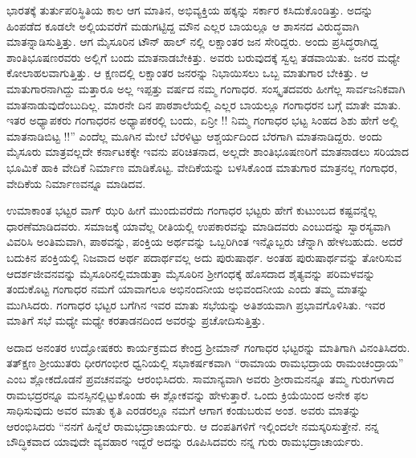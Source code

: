{ಭಾರತಕ್ಕೆ ತುರ್ತುಪರಿಸ್ಥಿತಿಯ ಕಾಲ \enginline{-} ಆಗ ಮಾತಿನ, ಅಭಿವ್ಯಕ್ತಿಯ ಹಕ್ಕನ್ನು ಸರ್ಕಾರ ಕಸಿದುಕೊಂಡಿತ್ತು.  ಅದನ್ನು ಹಿಂಪಡೆದ ಕೂಡಲೇ ಅಲ್ಲಿಯವರೆಗೆ ಮಡುಗಟ್ಟಿದ್ದ ಮೌನ ಎಲ್ಲರ ಬಾಯಲ್ಲೂ ಆ ಶಾಸನದ ವಿರುದ್ಧವಾಗಿ ಮಾತನ್ನಾಡಿಸುತ್ತಿತ್ತು. ಆಗ ಮೈಸೂರಿನ ಟೌನ್ ಹಾಲ್ ನಲ್ಲಿ ಲಕ್ಷಾಂತರ ಜನ ಸೇರಿದ್ದರು. ಅಂದು ಪ್ರಸಿದ್ಧರಾಗಿದ್ದ ಶಾಂತಿ\break ಭೂಷಣರವರು ಅಲ್ಲಿಗೆ ಬಂದು ಮಾತನಾಡಬೇಕಿತ್ತು. ಅವರು ಬರುವುದಕ್ಕೆ ಸ್ವಲ್ಪ ತಡವಾಯಿತು. ಜನರ ಮಧ್ಯೇ ಕೋಲಾಹಲವಾಗುತ್ತಿತ್ತು. ಆ ಕ್ಷಣದಲ್ಲಿ ಲಕ್ಷಾಂತರ ಜನರನ್ನು ನಿಭಾಯಿಸಲು ಒಬ್ಬ ಮಾತುಗಾರ ಬೇಕಿತ್ತು. ಆ ಮಾತುಗಾರನಾಗಿದ್ದು ಮತ್ತಾರೂ ಅಲ್ಲ ಇಪ್ಪತ್ತು ವರ್ಷದ ನಮ್ಮ ಗಂಗಾಧರ. ಸಂಸ್ಕೃತದವರು ಹೀಗೆಲ್ಲ ಸಾರ್ವಜನಿಕ\-ವಾಗಿ ಮಾತನಾಡುವು\-ದೆಂಬುದಿಲ್ಲ. ಮಾರನೇ ದಿನ ಪಾಠಶಾಲೆಯಲ್ಲಿ ಎಲ್ಲರ ಬಾಯಲ್ಲೂ ಗಂಗಾಧರನ ಬಗ್ಗೆ ಮಾತೇ ಮಾತು. ಇತರ ಅಧ್ಯಾಪಕರು ಗಂಗಾಧರನ ಅಧ್ಯಾಪಕರಲ್ಲಿ ಬಂದು, ಏನ್ರೀ !! ನಿಮ್ಮ ಗಂಗಾಧರ ಭಟ್ಟ \enginline{-} ಸಿಂಹದ ಶಿಶು \enginline{-} ಹೇಗೆ ಅಲ್ಲಿ ಮಾತನಾಡಿ\-ಬಿಟ್ಟ !!” ಎಂದೆಲ್ಲ ಮೂಗಿನ ಮೇಲೆ ಬೆರಳಿಟ್ಟು ಆಶ್ಚರ್ಯದಿಂದ ಬೆರಗಾಗಿ ಮಾತನಾ\-ಡಿದ್ದರು. ಅಂದು ಮೈಸೂರು ಮಾತ್ರವಲ್ಲದೇ ಕರ್ನಾಟಕಕ್ಕೇ ಇವನು ಪರಿಚಿತನಾದ, ಅಲ್ಲದೇ ಶಾಂತಿಭೂಷಣರಿಗೆ  ಮಾತನಾಡಲು ಸರಿಯಾದ ಭೂಮಿಕೆ ಹಾಕಿ ವೇದಿಕೆ ನಿರ್ಮಾಣ ಮಾಡಿಕೊಟ್ಟ. ವೇದಿಕೆಯನ್ನು ಬಳಸಿಕೊಂಡ ಮಾತುಗಾರ ಮಾತ್ರನಲ್ಲ ಗಂಗಾಧರ, \hbox{ವೇದಿಕೆಯ} ನಿರ್ಮಾಣವನ್ನೂ ಮಾಡಿದವ. 

ಉಮಾಕಾಂತ ಭಟ್ಟರ ವಾಗ್ ಝರಿ  ಹೀಗೆ ಮುಂದುವರೆದು ಗಂಗಾಧರ ಭಟ್ಟರು ಹೇಗೆ ಕುಟುಂಬದ ಕಷ್ಟವನ್ನೆಲ್ಲ ಧಾರಣೆಮಾಡಿದವರು. ಸಮಾಜಕ್ಕೆ ಯಾವೆಲ್ಲ ರೀತಿಯಲ್ಲಿ ಉಪಕಾರವನ್ನು ಮಾಡಿದವರು ಎಂಬುದನ್ನು ಸ್ವಾರಸ್ಯವಾಗಿ ವಿವರಿಸಿ ಅಂತಿಮವಾಗಿ, \enginline{-} ಪಾಠವನ್ನು, ಪಂಕ್ತಿಯ ಅರ್ಥವನ್ನು ಒಬ್ಬರಿಗಿಂತ ಇನ್ನೊಬ್ಬರು  ಚೆನ್ನಾಗಿ ಹೇಳಬಹುದು. ಅದರೆ ಬದುಕಿನ ಪಂಕ್ತಿಯಲ್ಲಿ ನಿಜವಾದ ಅರ್ಥ ಪದಾರ್ಥವಲ್ಲ ಅದು ಪುರುಷಾರ್ಥ. ಅಂತಹ ಪುರುಷಾರ್ಥವನ್ನು ತೋರಿಸುವ ಆದರ್ಶಜೀವನವನ್ನು ಮೈಸೂರಿನಲ್ಲಿ\break ಮಾಡುತ್ತಾ ಮೈಸೂರಿನ ಶ್ರೀಗಂಧಕ್ಕೆ ಹೊಸದಾದ ಶೈತ್ಯವನ್ನು ಪರಿಮಳವನ್ನು ತಂದು\-ಕೊಟ್ಟ ಗಂಗಾಧರ ನಮಗೆ ಯಾವಾಗಲೂ ಅಭಿನಂದನೀಯ ಅಭಿವಂದನೀಯ ಎಂದು ತಮ್ಮ ಮಾತನ್ನು ಮುಗಿಸಿದರು. ಗಂಗಾಧರ ಭಟ್ಟರ ಬಗೆಗಿನ ಇವರ ಮಾತು ಸಭೆಯನ್ನು ಅತಿಶಯವಾಗಿ ಪ್ರಭಾವಗೊಳಿಸಿತು. ಇವರ ಮಾತಿಗೆ ಸಭೆ ಮಧ್ಯೇ ಮಧ್ಯೇ ಕರತಾಡನದಿಂದ ಅವರನ್ನು ಪ್ರಚೋದಿಸುತ್ತಿತ್ತು.

ಅದಾದ ಅನಂತರ ಉದ್ಘೋಷಕರು ಕಾರ್ಯಕ್ರಮದ ಕೇಂದ್ರ ಶ್ರೀಮಾನ್ ಗಂಗಾಧರ ಭಟ್ಟರನ್ನು ಮಾತಿಗಾಗಿ ವಿನಂತಿಸಿದರು. ತತ್\enginline{-}ಕ್ಷಣ ಶ್ರೀಯುತರು ಧೀರ\enginline{-}ಗಂಭೀರ ಧ್ವನಿಯಲ್ಲಿ ಸಭಾಕರ್ಷಕವಾಗಿ “ರಾಮಾಯ ರಾಮಭದ್ರಾಯ ರಾಮಂಚಂದ್ರಾಯ” ಎಂಬ ಶ್ಲೋಕದೊಡನೆ ಪ್ರವಚನವನ್ನು ಆರಂಭಿಸಿದರು. ಸಾಮಾನ್ಯವಾಗಿ ಅವರು ಶ್ರೀರಾಮ\-ನನ್ನೂ ತಮ್ಮ ಗುರುಗಳಾದ ರಾಮಭದ್ರರನ್ನೂ ಮನಸ್ಸಿನಲ್ಲಿಟ್ಟುಕೊಂಡು ಈ ಶ್ಲೋಕವನ್ನು ಹೇಳುತ್ತಾರೆ. ಒಂದು ಕ್ರಿಯೆಯಿಂದ ಅನೇಕ ಫಲ ಸಾಧಿಸುವುದು ಅವರ ಮಾತು ಕೃತಿ ಎರಡರಲ್ಲೂ ನಮಗೆ ಆಗಾಗ ಕಂಡುಬರುವ ಅಂಶ. ಅವರು ಮಾತನ್ನು ಆರಂಭಿಸಿದರು\enginline{-} “ನನಗೆ ಹಿನ್ನೆಲೆ ರಾಮಭದ್ರಾಚಾರ್ಯರು. ಆ ದಂಪತಿಗಳಿಗೆ ಇಲ್ಲಿಂದಲೇ ನಮಸ್ಕರಿಸುತ್ತೇನೆ. ನನ್ನ ಬೌದ್ಧಿಕವಾದ ಯಾವುದೇ ವ್ಯವಹಾರ ಇದ್ದರೆ ಅದನ್ನು ರೂಪಿಸಿದವರು ನನ್ನ ಗುರು ರಾಮಭದ್ರಾಚಾರ್ಯರು. 

}

